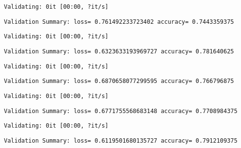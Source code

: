 \documentclass[11pt]{article}
\begin{document}
    
    \begin{Verbatim}[commandchars=\\\{\}]
Validating: 0it [00:00, ?it/s]
    \end{Verbatim}

    
    \begin{Verbatim}[commandchars=\\\{\}]
Validation Summary: loss= 0.761492233723402 accuracy= 0.7443359375
    \end{Verbatim}

    
    \begin{Verbatim}[commandchars=\\\{\}]
Validating: 0it [00:00, ?it/s]
    \end{Verbatim}

    
    \begin{Verbatim}[commandchars=\\\{\}]
Validation Summary: loss= 0.6323633193969727 accuracy= 0.781640625
    \end{Verbatim}

    
    \begin{Verbatim}[commandchars=\\\{\}]
Validating: 0it [00:00, ?it/s]
    \end{Verbatim}

    
    \begin{Verbatim}[commandchars=\\\{\}]
Validation Summary: loss= 0.6870658077299595 accuracy= 0.766796875
    \end{Verbatim}

    
    \begin{Verbatim}[commandchars=\\\{\}]
Validating: 0it [00:00, ?it/s]
    \end{Verbatim}

    
    \begin{Verbatim}[commandchars=\\\{\}]
Validation Summary: loss= 0.6771755568683148 accuracy= 0.7708984375
    \end{Verbatim}

    
    \begin{Verbatim}[commandchars=\\\{\}]
Validating: 0it [00:00, ?it/s]
    \end{Verbatim}

    
    \begin{Verbatim}[commandchars=\\\{\}]
Validation Summary: loss= 0.6119501680135727 accuracy= 0.7912109375
    \end{Verbatim}
\end{document}
